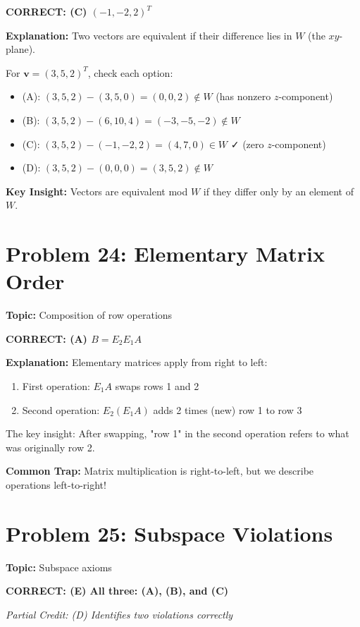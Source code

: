 \documentclass[12pt]{amsart}
\newcommand{\correct}[1]{{\color{blue}\textbf{CORRECT: #1}}}
\newcommand{\partcred}[1]{{\color{red}\textit{Partial Credit: #1}}}
\newcommand{\hint}{\textbf{Key Insight: }}
\newcommand{\trap}{\textbf{Common Trap: }}
\begin{document}
\correct{(C) $(-1, -2, 2)^T$}

\textbf{Explanation:} Two vectors are equivalent if their difference lies in $W$ (the $xy$-plane).

For $\mathbf{v} = (3, 5, 2)^T$, check each option:

\begin{itemize}
\item (A): $(3,5,2) - (3,5,0) = (0,0,2) \notin W$ (has nonzero $z$-component)
\item (B): $(3,5,2) - (6,10,4) = (-3,-5,-2) \notin W$
\item (C): $(3,5,2) - (-1,-2,2) = (4,7,0) \in W$ ✓ (zero $z$-component)
\item (D): $(3,5,2) - (0,0,0) = (3,5,2) \notin W$
\end{itemize}

\hint Vectors are equivalent mod $W$ if they differ only by an element of $W$.

\hrulefill

\section*{Problem 24: Elementary Matrix Order}
\textbf{Topic:} Composition of row operations

\correct{(A) $B = E_2 E_1 A$}

\textbf{Explanation:} Elementary matrices apply from right to left:
\begin{enumerate}
\item First operation: $E_1 A$ swaps rows 1 and 2
\item Second operation: $E_2(E_1 A)$ adds 2 times (new) row 1 to row 3
\end{enumerate}

The key insight: After swapping, "row 1" in the second operation refers to what was originally row 2.

\trap Matrix multiplication is right-to-left, but we describe operations left-to-right!

\hrulefill

\section*{Problem 25: Subspace Violations}
\textbf{Topic:} Subspace axioms

\correct{(E) All three: (A), (B), and (C)}

\partcred{(D) Identifies two violations correctly}
\end{document}
